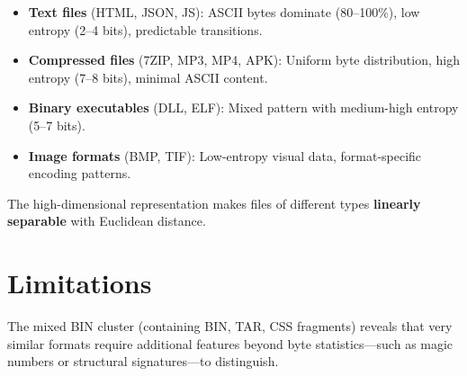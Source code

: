 \documentclass[12pt,a4paper]{report}
\begin{document}
\begin{normalsize}
{\begin{itemize}
    \item \textbf{Text files} (HTML, JSON, JS): ASCII bytes dominate (80--100\%), low entropy (2--4 bits), predictable transitions.
    \item \textbf{Compressed files} (7ZIP, MP3, MP4, APK): Uniform byte distribution, high entropy (7--8 bits), minimal ASCII content.
    \item \textbf{Binary executables} (DLL, ELF): Mixed pattern with medium-high entropy (5--7 bits).
    \item \textbf{Image formats} (BMP, TIF): Low-entropy visual data, format-specific encoding patterns.
\end{itemize}

The high-dimensional representation makes files of different types \textbf{linearly separable} with Euclidean distance.
\par}

\section{Limitations}
{\setlength{\baselineskip}{1.0\baselineskip}
The mixed BIN cluster (containing BIN, TAR, CSS fragments) reveals that very similar formats require additional features beyond byte statistics---such as magic numbers or structural signatures---to distinguish.
\par}

\end{normalsize}

\newpage
\end{document}
